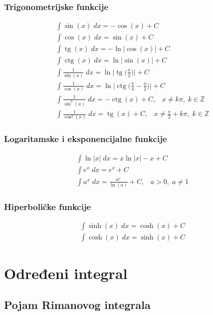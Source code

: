 \documentclass[a4paper,12pt,twoside]{report}
\numberwithin{algorithm}{section}
\renewcommand{\tan}{\operatorname{tg}}
\renewcommand{\cot}{\operatorname{ctg}}
\begin{document}
\subsubsection{Trigonometrijske funkcije}
\[
    \begin{aligned}
        &\int \sin (x)\;dx = -\cos (x) + C\\[8pt]
        &\int \cos(x)\;dx = \sin (x)+C\\[8pt]
        &\int \tan(x)\; dx = -\ln\left|\cos(x)\right| + C\\[8pt]
        &\int \cot(x) \;dx = \ln\left|\sin(x)\right| + C\\[8pt]
        &\int \frac{1}{\sin(x)}\;dx = \ln\bigg|\tan \bigg(\frac{x}{2}\bigg)\bigg| + C\\[8pt]
        &\int \frac{1}{\cos(x)}\;dx = \ln\bigg|\cot \bigg(\frac{\pi}{4} - \frac{x}{2}\bigg)\bigg| + C\\[8pt]
        &\int \frac{1}{\sin^2(x)}\;dx = -\cot (x) + C,\;\;\;x \neq k\pi,\;k\in \mathbb{Z}\\[8pt]
        &\int \frac{1}{\cos ^2 (x)}\;dx = \tan (x) + C,\;\;\;x\neq \frac{\pi}{2} + k\pi,\;k\in\mathbb{Z}
    \end{aligned}
\]

\subsubsection{Logaritamske i eksponencijalne funkcije}
\[
    \begin{aligned}
        &\int \ln|x|\;dx = x\ln|x| - x + C\\[8pt]
        &\int e^x\;dx = e^x+C\\[8pt]
        &\int a^x\;dx =\frac{a^x}{\ln (a)} + C,\;\;\;a>0,\;a\neq 1
    \end{aligned}
\]

\subsubsection{Hiperboličke funkcije}
\[
    \begin{aligned}
        &\int \sinh(x) \; dx = \cosh(x) + C\\[8pt]
        &\int \cosh(x) \; dx = \sinh(x) + C
    \end{aligned}
\]

\newpage
\section{Određeni integral}
\subsection{Pojam Rimanovog integrala}
\end{document}
